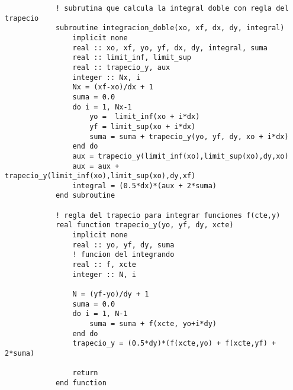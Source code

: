 \begin{lstlisting}
            ! subrutina que calcula la integral doble con regla del trapecio
            subroutine integracion_doble(xo, xf, dx, dy, integral)
                implicit none
                real :: xo, xf, yo, yf, dx, dy, integral, suma
                real :: limit_inf, limit_sup
                real :: trapecio_y, aux
                integer :: Nx, i
                Nx = (xf-xo)/dx + 1
                suma = 0.0
                do i = 1, Nx-1
                    yo =  limit_inf(xo + i*dx)
                    yf = limit_sup(xo + i*dx)
                    suma = suma + trapecio_y(yo, yf, dy, xo + i*dx)
                end do
                aux = trapecio_y(limit_inf(xo),limit_sup(xo),dy,xo) 
                aux = aux + trapecio_y(limit_inf(xo),limit_sup(xo),dy,xf)
                integral = (0.5*dx)*(aux + 2*suma)
            end subroutine
    
            ! regla del trapecio para integrar funciones f(cte,y)
            real function trapecio_y(yo, yf, dy, xcte)
                implicit none
                real :: yo, yf, dy, suma
                ! funcion del integrando
                real :: f, xcte
                integer :: N, i
    
                N = (yf-yo)/dy + 1
                suma = 0.0
                do i = 1, N-1
                    suma = suma + f(xcte, yo+i*dy)
                end do
                trapecio_y = (0.5*dy)*(f(xcte,yo) + f(xcte,yf) + 2*suma)
    
                return
            end function
\end{lstlisting}